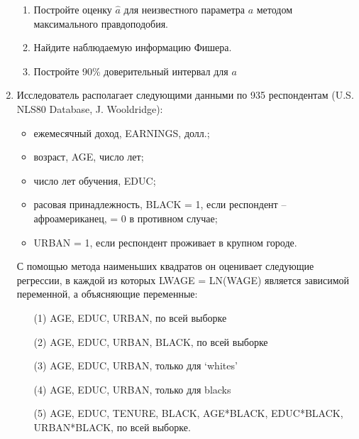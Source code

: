 \documentclass[pdftex,12pt,a4paper]{article}
\begin{document}
\begin{enumerate}
\begin{enumerate}
\item Постройте оценку $\hat{a}$ для неизвестного параметра $a$ методом максимального правдоподобия.
\item Найдите наблюдаемую информацию Фишера.
\item Постройте 90\% доверительный интервал для $a$
\end{enumerate}
\item Исследователь располагает следующими данными по 935 респондентам (U.S. NLS80 Database, J. Wooldridge):\\
\begin{itemize}
\item ежемесячный доход, EARNINGS, долл.;
\item возраст, AGE, число лет;
\item число лет обучения, EDUC;
\item расовая принадлежность, BLACK = 1, если респондент – афроамериканец, = 0 в противном случае;
\item URBAN = 1, если респондент проживает в крупном городе.
\end{itemize}
С помощью метода наименьших квадратов он оценивает следующие регрессии, в каждой из которых LWAGE = LN(WAGE) является зависимой переменной, а объясняющие переменные:
\begin{enumerate}
\item[(1)] AGE, EDUC, URBAN, по всей выборке
\item[(2)] AGE, EDUC, URBAN, BLACK, по всей выборке
\item[(3)] AGE, EDUC, URBAN, только для ‘whites’
\item[(4)] AGE, EDUC, URBAN, только для blacks
\item[(5)] AGE, EDUC, TENURE, BLACK, AGE*BLACK, EDUC*BLACK, URBAN*BLACK, по всей выборке.
\end{enumerate}


\end{enumerate}
\end{document}
